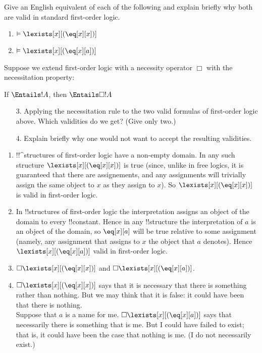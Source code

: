 \documentclass[../../../include/open-logic-section]{subfiles}
\begin{document}


\begin{prob}
Give an English equivalent of each of the following and explain
 briefly why both are valid in standard first-order logic.
\begin{enumerate}
\item $\vDash \lexists[x][(\eq[x][x])]$
\item $\vDash \lexists[x][(\eq[x][a])]$
\end{enumerate}

\noindent Suppose we extend first-order logic with a necessity
operator $\Box$ with the  
necessitation property:
\begin{defn}
If $\Entails !A$, then $\Entails \Box !A$
\end{defn}

\begin{enumerate}
	\item[3.] Applying the necessitation rule to the two valid
	formulas of first-order logic above. Which validities do we get?
	(Give only two.) 
	\item[4.] Explain briefly why one would not want to accept the
	resulting validities.
\end{enumerate}

\begin{ans}
\begin{enumerate}
\item !!^{structure}s of first-order logic have a non-empty domain. In
	any such structure $\lexists[x][(\eq[x][x])]$ is true (since,
	unlike in free logics, it is guaranteed that there are
	assignements, and any assignments will trivially assign the same
	object to $x$ as they assign to $x$). So
	$\lexists[x][(\eq[x][x])]$ is valid in first-order logic. 
\item In !!{structure}s of first-order logic the interpretation
	assigns an object of the  domain to every !!{constant}. Hence in
	any !!{structure} the interpretation of $a$ is an object of the
	domain, so $\eq[x][a]$ will be true relative to some assignment
	(namely, any assignment that assigns to $x$ the object that $a$
	denotes). Hence $\lexists[x][(\eq[x][a])]$ valid in first-order
	logic. 
\item $\Box\lexists[x][(\eq[x][x])]$ and
$\Box\lexists[x][(\eq[x][a])]$.
\item $\Box\lexists[x][(\eq[x][x])]$ says that it is necessary that
	there is something rather than nothing. But we may think that it
	is false: it could have been that there is nothing. \\
	Suppose that $a$ is a name for me. $\Box\lexists[x][(\eq[x][a])]$
	says that necessarily there is something that is me. But I could
	have failed to exist; that is, it could have been the case that
	nothing is me. (I do not necessarily exist.)
\end{enumerate}
\end{ans}
\end{prob}
\end{document}
